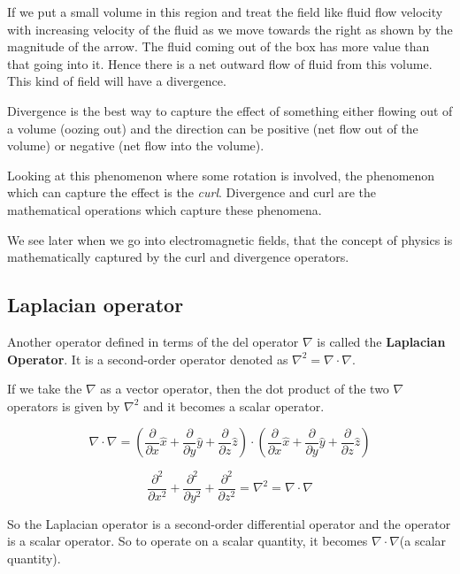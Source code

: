 If we put a small volume in this region and treat the field like fluid flow velocity with increasing velocity of the fluid as we move towards the right as shown by the magnitude of the arrow. The fluid coming out of the box has more value than that going into it. Hence there is a net outward flow of fluid from this volume. This kind of field will have a divergence.

Divergence is the best way to capture the effect of something either flowing out of a volume (oozing out) and the direction can be positive (net flow out of the volume) or negative (net flow into the volume).

Looking at this phenomenon where some rotation is involved, the phenomenon which can capture the effect is the \textit{curl}. Divergence and curl are the mathematical operations which capture these phenomena.

We see later when we go into electromagnetic fields, that the concept of physics is mathematically captured by the curl and divergence operators.

\subsection{Laplacian operator}
Another operator defined in terms of the del operator $\nabla$ is called the \textbf{Laplacian Operator}. It is a second-order operator denoted as $\nabla^2 = \nabla \cdot \nabla$.

If we take the $\nabla$ as a vector operator, then the dot product of the two $\nabla$ operators is given by $\nabla^2$ and it becomes a scalar operator.

\begin{dmath}
\nabla \cdot \nabla =  \left(\frac{\partial  }{\partial x}\hat x + \frac{\partial  }{\partial y}\hat y + \frac{\partial  }{\partial z}\hat z \right) \cdot \left( \frac{\partial  }{\partial x}\hat x + \frac{\partial  }{\partial y}\hat y + \frac{\partial  }{\partial z}\hat z\right)
\end{dmath}

\begin{dmath}
\frac{\partial^{2}  }{\partial x^{2}} + \frac{\partial^{2}  }{\partial y^{2}} + \frac{\partial^{2}  }{\partial z^{2}}= \nabla^{2} = \nabla \cdot \nabla
\end{dmath}

So the Laplacian operator is a second-order differential operator and the operator is a scalar operator. So to operate on a scalar quantity, it becomes $\nabla\cdot\nabla$(a scalar quantity).

